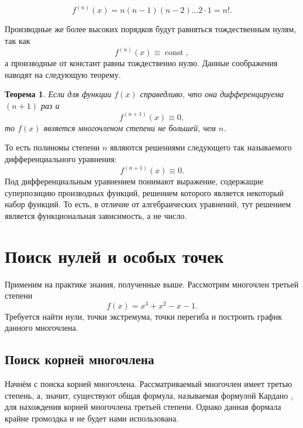 \documentclass[12pt]{article}
\DeclareMathOperator\const{const}
\newtheorem{theorem}{Теорема}[section]
\begin{document}
\begin{equation}
	f^{(n)}(x) = n(n-1)(n-2)\ldots2\cdot 1 = n!.
\end{equation}

Производные же более высоких порядков будут равняться тождественным нулям, так как
\begin{equation}
	f^{(n)}(x) \equiv \const,
\end{equation}
а производные от констант равны тождественно нулю. Данные соображения наводят на следующую теорему.

\begin{theorem}
Если для функции $f(x)$ справедливо, что она дифференцируема $(n+1)$ раз и
\begin{equation}
	f^{(n+1)}(x) \equiv 0,
\end{equation}
то $f(x)$ является многочленом степени не большей, чем $n$.
\end{theorem}

То есть полиномы степени $n$ являются решениями следующего так называемого дифференциального уравнения:
\begin{equation}
		f^{(n+1)}(x) \equiv 0.
\end{equation}
Под дифференциальным уравнением понимают выражение, содержащие суперпозицию производных функций, решением которого является некоторый набор функций. То есть, в отличие от алгебраических уравнений, тут решением является функциональная зависимость, а не число.

\section{Поиск нулей и особых точек}
Применим на практике знания, полученные выше. Рассмотрим многочлен третьей степени
\begin{equation}
	f(x) = x^3 + x^2 -x -1.
\end{equation}
Требуется найти нули, точки экстремума, точки перегиба и построить график данного многочлена.

\subsection{Поиск корней многочлена} %
Начнём с поиска корней многочлена. Рассматриваемый многочлен имеет третью степень, а, значит, существуют общая формула, называемая формулой Кардано \cite{root3}, для нахождения корней многочлена третьей степени. Однако данная формала крайне громоздка и не будет нами использована.
\end{document}
